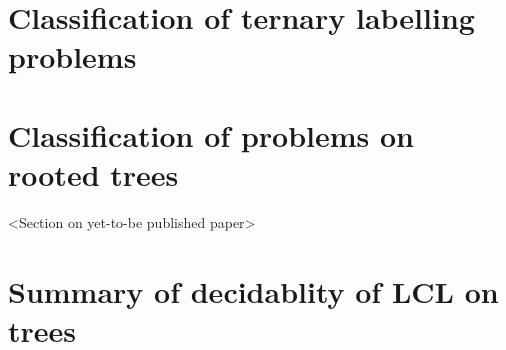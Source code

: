 \section{Classification of ternary labelling problems}



\section{Classification of problems on rooted trees}

<Section on yet-to-be published paper>

\section{Summary of decidablity of LCL on trees}

